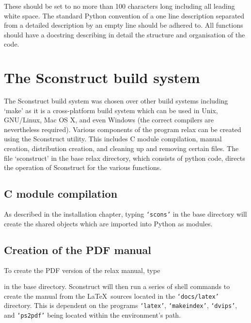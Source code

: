 These should be set to no more than 100 characters long including all leading white space.  The standard Python convention of a one line description separated from a detailed description by an empty line should be adhered to.  All functions should have a docstring describing in detail the structure and organisation of the code.




\section{The Sconstruct build system}

The Sconstruct build system was chosen over other build systems including `make' as it is a cross-platform build system which can be used in Unix, GNU/Linux, Mac OS X, and even Windows (the correct compilers are nevertheless required).  Various components of the program relax can be created using the Sconstruct utility.  This includes C module compilation, manual creation, distribution creation, and cleaning up and removing certain files.  The file `sconstruct' in the base relax directory, which consists of python code, directs the operation of Sconstruct for the various functions.


\subsection{C module compilation}

As described in the installation chapter, typing \texttt{`scons'} in the base directory will create the shared objects which are imported into Python as modules.


\subsection{Creation of the PDF manual}

To create the PDF version of the relax manual, type


in the base directory.  Sconstruct will then run a series of shell commands to create the manual from the \LaTeX\ sources located in the \texttt{`docs/latex'} directory.  This is dependent on the programs \texttt{`latex'}, \texttt{`makeindex'}, \texttt{`dvips'}, and \texttt{`ps2pdf'} being located within the environment's path.


